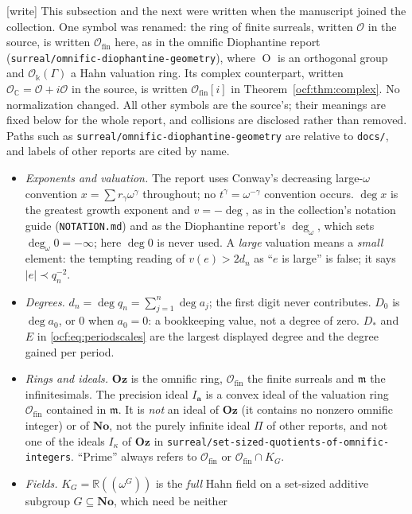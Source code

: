 \documentclass[11pt,a4paper]{article}
\numberwithin{equation}{section}
\theoremstyle{definition}
\theoremstyle{remark}
\newcommand{\No}{\mathbf{No}}
\newcommand{\Oz}{\mathbf{Oz}}
\newcommand{\R}{\mathbb R}
\newcommand{\C}{\mathbb C}
\newcommand{\Ofin}{\mathcal O_{\mathrm{fin}}}%
\newcommand{\mm}{\mathfrak m}
\newcommand{\dgr}{\operatorname{deg}}
\newcommand{\codea}{\boldsymbol a}
\newcommand{\rpath}[1]{\nolinkurl{#1}}%
\newcommand{\wtag}{\textup{[write]}}%
\begin{document}
\wtag{} This subsection and the next were written when the manuscript
joined the collection. One symbol was renamed: the ring of finite surreals,
written $\mathcal O$ in the source, is written $\Ofin$ here, as in the
omnific Diophantine report (\rpath{surreal/omnific-diophantine-geometry}),
where $\operatorname{O}$ is an orthogonal group and $\mathcal O_\Bbbk(\Gamma)$ a
Hahn valuation ring. Its complex counterpart, written $\mathcal
O_\C=\mathcal O+i\mathcal O$ in the source, is written $\Ofin[i]$ in
Theorem~\ref{ocf:thm:complex}. No normalization changed. All other symbols
are the source's; their meanings are fixed below for the whole report, and
collisions are disclosed rather than removed. Paths such as
\rpath{surreal/omnific-diophantine-geometry} are relative to
\rpath{docs/}, and labels of other reports are cited by name.
\begin{itemize}[leftmargin=*,itemsep=3pt]
\item \emph{Exponents and valuation.} The report uses Conway's decreasing
large-$\omega$ convention $x=\sum r_\gamma\omega^\gamma$ throughout; no
$t^\gamma=\omega^{-\gamma}$ convention occurs. $\dgr x$ is the greatest
growth exponent and $v=-\dgr$, as in the collection's notation guide
(\rpath{NOTATION.md}) and as the Diophantine report's
$\operatorname{deg}_\omega$, which sets $\operatorname{deg}_\omega0=-\infty$;
here $\dgr0$ is never used. A \emph{large} valuation means a \emph{small}
element: the tempting reading of $v(e)>2d_n$ as ``$e$ is large'' is false;
it says $\lvert e\rvert\prec q_n^{-2}$.
\item \emph{Degrees.} $d_n=\dgr q_n=\sum_{j=1}^n\dgr a_j$; the first digit
never contributes. $D_0$ is $\dgr a_0$, or $0$ when $a_0=0$: a bookkeeping
value, not a degree of zero. $D_*$ and $E$ in \eqref{ocf:eq:periodscales}
are the largest displayed degree and the degree gained per period.
\item \emph{Rings and ideals.} $\Oz$ is the omnific ring, $\Ofin$ the finite
surreals and $\mm$ the infinitesimals. The precision ideal $I_{\codea}$ is a
convex ideal of the valuation ring $\Ofin$ contained in $\mm$. It is
\emph{not} an ideal of $\Oz$ (it contains no nonzero omnific integer) or of
$\No$, not the purely infinite ideal $\Pi$ of other reports, and not one of
the ideals $I_\kappa$ of $\Oz$ in \rpath{surreal/set-sized-quotients-of-omnific-integers}.
``Prime'' always refers to $\Ofin$ or $\Ofin\cap K_G$.
\item \emph{Fields.} $K_G=\R((\omega^G))$ is the \emph{full} Hahn field on a
set-sized additive subgroup $G\subseteq\No$, which need be neither

\end{itemize}
\end{document}
